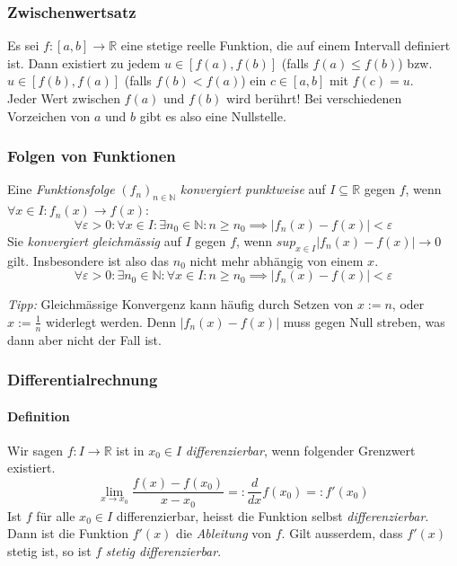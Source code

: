 \documentclass[a4paper, 9pt, DIV=24]{scrartcl}
\newcommand{\N}{\mathbb{N}}
\newcommand{\R}{\mathbb{R}}
\begin{document}
\subsubsection{Zwischenwertsatz}
Es sei $f: [a,b] \to \R$ eine stetige reelle Funktion, die auf einem Intervall definiert ist.
Dann existiert zu jedem $u\in [f(a), f(b)]$ (falls $f(a)\leq f(b)$) bzw. $u\in [f(b), f(a)]$ (falls $f(b)< f(a)$) ein $c\in [a,b]$ mit $f\left(c\right)=u$. \\
     Jeder Wert zwischen $f(a)$ und $f(b)$ wird berührt! Bei verschiedenen Vorzeichen von $a$ und $b$ gibt es also eine Nullstelle.

\subsubsection{Folgen von Funktionen}
Eine \emph{Funktionsfolge} $(f_n)_{n\in\N}$ \emph{konvergiert punktweise} auf $I \subseteq \R$ gegen $f$, wenn $\forall x\in I: f_n(x) \rightarrow f(x)$:
\[ \forall \varepsilon > 0: \forall x \in I: \exists n_0 \in \N: n \geq n_0 \implies |f_n(x)-f(x)| < \varepsilon \]
Sie \emph{konvergiert gleichmässig} auf $I$ gegen $f$, wenn $sup_{x\in I} |f_n(x) - f(x)| \rightarrow 0$ gilt.
Insbesondere ist also das $n_0$ nicht mehr abhängig von einem $x$.
\[ \forall \varepsilon > 0: \exists n_0 \in \N: \forall x \in I: n \geq n_0 \implies |f_n(x)-f(x)| < \varepsilon \]

\emph{Tipp: } Gleichmässige Konvergenz kann häufig durch Setzen von $x := n$, oder $x := \frac{1}{n}$ widerlegt werden.
Denn $|f_n(x) - f(x)|$ muss gegen Null streben, was dann aber nicht der Fall ist.

\subsubsection{Differentialrechnung}

\paragraph{Definition}
Wir sagen $f: I \rightarrow \R$ ist in $x_0 \in I$ \emph{differenzierbar}, wenn folgender Grenzwert existiert.
\[
 \lim_{x\rightarrow x_0} \dfrac{f(x) - f(x_0)}{x - x_0} =: \dfrac{d}{dx} f(x_0) =: f'(x_0)
\]
Ist $f$ für alle $x_0 \in I$ differenzierbar, heisst die Funktion selbst \emph{differenzierbar}.
Dann ist die Funktion $f'(x)$ die \emph{Ableitung} von $f$.
Gilt ausserdem, dass $f'(x)$ stetig ist, so ist $f$ \emph{stetig differenzierbar}.
\end{document}
